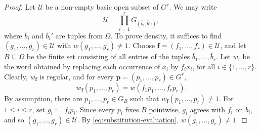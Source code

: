 \documentclass[10pt,a4paper]{amsart}
\begin{document}
\begin{proof} {Let $\mathcal{U}$ be a non-empty basic open subset of $G^r$. We may write}
\[
  \mathcal{U}
  = \prod_{i=1}^r G_{(\overline{b}_i, \overline{b}'_i)},\]
{where $\overline{b}_i$ and $\overline{b}_i'$ are tuples from $\Omega$.} {To prove density,} it suffices to find $(g_1,\ldots,g_r)\in \mathcal U$ with $w(g_1,\ldots,g_r)\neq 1$. Choose
$\mathbf f=(f_1,\ldots,f_r)\in\mathcal U$, and let $B\subseteq \Omega$ be the
finite set consisting of all entries of the tuples
$\bar b_1,\ldots,\bar b_r$. Let $w_{\mathbf f}$ be the word obtained by {replacing} each occurrence of $x_i$ by $f_ix_i$, for all {$i\in\{1, \dots, r\}$.} Clearly, $w_{\mathbf f}$ is regular, and for every
$\mathbf p=(p_1,\ldots,p_r)\in G^r$, 
\begin{equation}\label{eq:substitution-evaluation}
  w_{\mathbf f}(p_1,\ldots,p_r)
  =w(f_1p_1,\ldots,f_rp_r).
\end{equation}
By assumption, there are
$p_1,\ldots,p_r\in G_B$ such that $w_{\mathbf f}(p_1,\ldots,p_r)\neq 1$.
For  $1\leq i\leq r$, set $g_i:=f_i p_i$. Since every $p_i$ fixes $B$ pointwise, $g_i$ agrees with $f_i$ on
$\bar b_i$, and so $(g_1,\ldots,g_r)\in\mathcal U$. By \eqref{eq:substitution-evaluation}, $w(g_1, \dots, g_r)\neq1$.
\end{proof}
\end{document}
